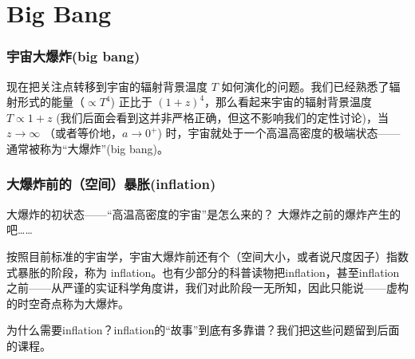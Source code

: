 \documentclass[CJK,13pt]{beamer}
\begin{document}




\section{Big Bang}

  \begin{frame}
    \frametitle{宇宙大爆炸(big bang)}
    现在把关注点转移到宇宙的辐射背景温度 $T$ 如何演化的问题。我们已经熟悉了辐射形式的能量（$\propto T^4$) 正比于 $(1+z)^4$，那么看起来宇宙的辐射背景温度 $T\propto 1+z$ (我们后面会看到这并非严格正确，但这不影响我们的定性讨论)，当 $z\rightarrow \infty$ （或者等价地，$a\rightarrow 0^+$) 时，宇宙就处于一个高温高密度的极端状态——通常被称为“大爆炸”(big bang)。

        \skipline
        
  \end{frame}


  \begin{frame}
    \frametitle{大爆炸前的（空间）暴胀(inflation)}
    \question 大爆炸的初状态——“高温高密度的宇宙”是怎么来的？
    \answer 大爆炸之前的爆炸产生的吧……

    \skiplines

    按照目前标准的宇宙学，宇宙大爆炸前还有个（空间大小，或者说尺度因子）指数式暴胀的阶段，称为 inflation。也有少部分的科普读物把inflation，甚至inflation之前——从严谨的实证科学角度讲，我们对此阶段一无所知，因此只能说——虚构的时空奇点称为大爆炸。

    \skiplines

    为什么需要inflation？inflation的“故事”到底有多靠谱？我们把这些问题留到后面的课程。
  \end{frame}
  

    \ech
\end{document}
